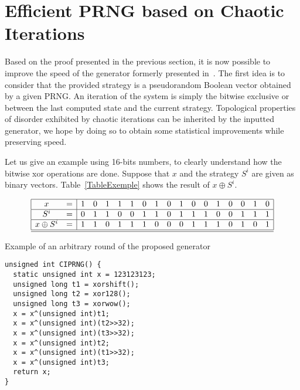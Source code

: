 \documentclass{article}
\begin{document}
\section{Efficient PRNG based on Chaotic Iterations}
\label{sec:efficient PRNG}

Based on the proof presented in the previous section, it is now possible to 
improve the speed of the generator formerly presented in~\cite{bgw09:ip,guyeux10}. 
The first idea is to consider
that the provided strategy is a pseudorandom Boolean vector obtained by a
given PRNG.
An iteration of the system is simply the bitwise exclusive or between
the last computed state and the current strategy.
Topological properties of disorder exhibited by chaotic 
iterations can be inherited by the inputted generator, we hope by doing so to 
obtain some statistical improvements while preserving speed.


Let us give an example using 16-bits numbers, to clearly understand how the bitwise xor operations
are
done.  
Suppose  that $x$ and the  strategy $S^i$ are given as
binary vectors.
Table~\ref{TableExemple} shows the result of $x \oplus S^i$.

\begin{table}
$$
\begin{array}{|cc|cccccccccccccccc|}
\hline
x      &=&1&0&1&1&1&0&1&0&1&0&0&1&0&0&1&0\\
\hline
S^i      &=&0&1&1&0&0&1&1&0&1&1&1&0&0&1&1&1\\
\hline
x \oplus S^i&=&1&1&0&1&1&1&0&0&0&1&1&1&0&1&0&1\\
\hline

\hline
 \end{array}
$$
\caption{Example of an arbitrary round of the proposed generator}
\label{TableExemple}
\end{table}




\begin{lstlisting}
unsigned int CIPRNG() {
  static unsigned int x = 123123123;
  unsigned long t1 = xorshift();
  unsigned long t2 = xor128();
  unsigned long t3 = xorwow();
  x = x^(unsigned int)t1;
  x = x^(unsigned int)(t2>>32);
  x = x^(unsigned int)(t3>>32);
  x = x^(unsigned int)t2;
  x = x^(unsigned int)(t1>>32);
  x = x^(unsigned int)t3;
  return x;
}
\end{lstlisting}
\end{document}
